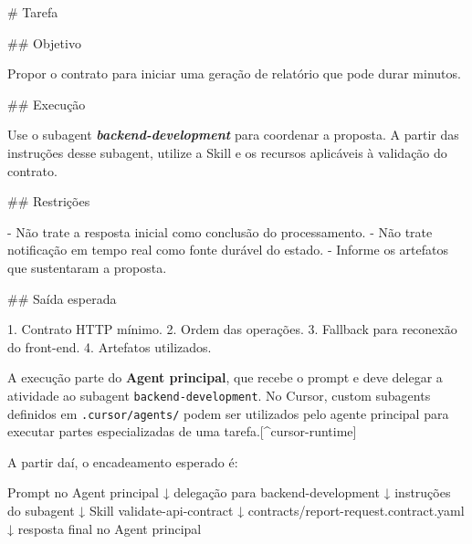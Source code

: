 \documentclass[
  10pt,
  a4paper,
  oneside]{book}
\newenvironment{Shaded}{}{}
\newcommand{\FunctionTok}[1]{\textcolor[rgb]{0.02,0.16,0.49}{#1}}
\newcommand{\InformationTok}[1]{\textcolor[rgb]{0.38,0.63,0.69}{\textbf{\textit{#1}}}}
\newcommand{\NormalTok}[1]{#1}
\newcommand{\SpecialStringTok}[1]{\textcolor[rgb]{0.73,0.40,0.53}{#1}}
\renewenvironment{Shaded}{\begin{snugshade}}{\end{snugshade}}%
\begin{document}
\begin{Shaded}
\begin{Highlighting}[]
\FunctionTok{\# Tarefa}

\FunctionTok{\#\# Objetivo}

\NormalTok{Propor o contrato para iniciar uma geração de relatório que pode durar minutos.}

\FunctionTok{\#\# Execução}

\NormalTok{Use o subagent }\InformationTok{\textasciigrave{}backend{-}development\textasciigrave{}}\NormalTok{ para coordenar a proposta. A partir das instruções desse subagent, utilize a Skill e os recursos aplicáveis à validação do contrato.}

\FunctionTok{\#\# Restrições}

\SpecialStringTok{{-} }\NormalTok{Não trate a resposta inicial como conclusão do processamento.}
\SpecialStringTok{{-} }\NormalTok{Não trate notificação em tempo real como fonte durável do estado.}
\SpecialStringTok{{-} }\NormalTok{Informe os artefatos que sustentaram a proposta.}

\FunctionTok{\#\# Saída esperada}

\SpecialStringTok{1. }\NormalTok{Contrato HTTP mínimo.}
\SpecialStringTok{2. }\NormalTok{Ordem das operações.}
\SpecialStringTok{3. }\NormalTok{Fallback para reconexão do front{-}end.}
\SpecialStringTok{4. }\NormalTok{Artefatos utilizados.}
\end{Highlighting}
\end{Shaded}

A execução parte do \textbf{Agent principal}, que recebe o prompt e deve
delegar a atividade ao subagent \texttt{backend-development}. No Cursor,
custom subagents definidos em \texttt{.cursor/agents/} podem ser
utilizados pelo agente principal para executar partes especializadas de
uma tarefa.{[}\^{}cursor-runtime{]}

A partir daí, o encadeamento esperado é:

\begin{Shaded}
\begin{Highlighting}[]
\NormalTok{Prompt no Agent principal}
\NormalTok{        ↓}
\NormalTok{delegação para backend{-}development}
\NormalTok{        ↓}
\NormalTok{instruções do subagent}
\NormalTok{        ↓}
\NormalTok{Skill validate{-}api{-}contract}
\NormalTok{        ↓}
\NormalTok{contracts/report{-}request.contract.yaml}
\NormalTok{        ↓}
\NormalTok{resposta final no Agent principal}
\end{Highlighting}
\end{Shaded}
\end{document}

